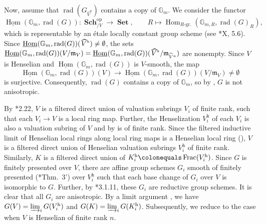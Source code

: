 \documentclass[a4paper,11pt,reqno]{amsart}
\newcommand{\bG}{\mathbb{G}}
\newcommand{\fm}{\mathfrak{m}}
\newcommand{\ra}{\rightarrow}
\newcommand{\wh}{\widehat}
\newcommand{\op}{^{\mathrm{op}}}
\newcommand{\ce}{\colonequals}
\newcommand{\un}{\underline}
\newcommand{\hva}{\!\stackon[-8pt]{\;$V^{\raisebox{1pt}{$\mathsmaller{\mathsmaller{a}}$}}$}{\vstretch{1.5}{\hstretch{1.7}{\widehat{\phantom{}}}}}}
\newcommand{\nhva}{\wh{V}^a}
\providecommand{\SP}[1]{\cite[\href{https://stacks.math.columbia.edu/tag/#1}{#1}]{SP}}
\DeclareMathOperator{\rad}{rad}			                       %
\DeclareMathOperator{\Hom}{Hom}			                       %
\DeclareMathOperator{\Frac}{Frac}		                       %
\DeclareMathOperator{\Sets}{\textbf{Set}}
\DeclareMathOperator{\Sch}{\textbf{Sch}}		                                                  %
\newcommand{\qq}{\quad\quad}
\theoremstyle{plain}
\theoremstyle{remark}
\theoremstyle{definition}
\theoremstyle{plain}
\theoremstyle{definition}
\theoremstyle{subsection-tweak}
\theoremstyle{subsection-tweak}
\numberwithin{equation}{subsection}
\begin{document}
      Now, assume that $\rad(G_{\nhva})$ contains a copy of $\bG_{m}$.
      We consider the functor
      \[
      \un{\Hom}(\bG_m, \rad(G))\colon \Sch\op_{/V}\ra \Sets, \qq R\mapsto \Hom_{\text{$R$-gr.}}(\mathbb{G}_{m,R}, \rad(G)_R),
      \]
      which is representable by an \'etale locally constant group scheme (see \cite{SGA3II}*{X, 5.6}).
      Since $\un{\Hom}(\bG_m,\rad(G))(\hva)\neq \emptyset$, the sets $\un{\Hom}(\bG_m, \rad(G))(V/\fm_V)=\un{\Hom}(\bG_m,\rad(G))(\hva/\fm_{\nhva})$ are nonempty.
      Since $V$ is Henselian and $\un{\Hom}(\bG_m,\rad(G))$ is $V$-smooth, the map 
      \[ 
         \un{\Hom}(\bG_m,\rad(G))(V)\ra \un{\Hom}(\bG_m,\rad(G))(V/\fm_V)\neq \emptyset
       \]
      is surjective. 
      Consequently, $\rad(G)$ contains a copy of $\bG_{m}$, so by , $G$ is not anisotropic.
      \item
      By \cite{BM20}*{2.22}, $V$ is a filtered direct union of valuation subrings $V_{i}$ of finite rank, such that each $V_{i}\ra V$ is a local ring map.
      Further, the Henselization $V_{i}^{\mathrm{h}}$ of each $V_{i}$ is also a valuation subring of $V$ and by \SP{0ASK} is of finite rank.
      Since the filtered inductive limit of Henselian local rings along local ring maps is a Henselian local ring (\SP{04GI}), $V$ is a filtered direct union of Henselian valuation subrings $V_{i}^{\mathrm{h}}$ of finite rank.
      Similarly, $K$ is a filtered direct union of $K_i^{\mathrm{h}}\ce\Frac(V_i^{\mathrm{h}})$.
      Since $G$ is finitely presented over $V$, there are affine group schemes $G_{i}$ smooth of finitely presented (\cite{Nag66}*{Thm.~3'}) over $V_{i}^{\mathrm{h}}$ such that each base change of $G_{i}$ over $V$ is isomorphic to $G$.
      Further, by \cite{Con14}*{3.1.11}, these $G_{i}$ are reductive group schemes.
      It is clear that all $G_{i}$ are anisotropic.
      By a limit argument \SP{01ZC}, we have $G(V)=\varinjlim_{i}G(V_i^{\mathrm{h}})$ and $G(K)=\varinjlim_{i}G(K_i^{\mathrm{h}})$.
      Subsequently, we reduce to the case when $V$ is Henselian of finite rank $n$.
\end{document}
